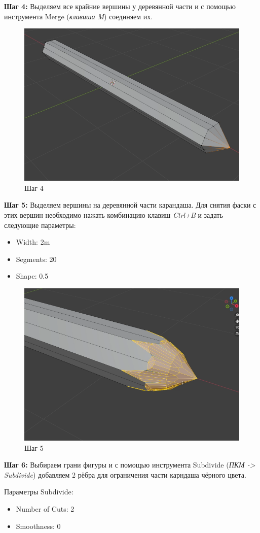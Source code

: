 \documentclass[areasetadvanced]{scrartcl}
\begin{document}
\par \textbf{Шаг 4:} Выделяем все крайние вершины у деревянной части и с помощью инструмента Merge (\textit{клавиша M}) соединяем их.
\begin{figure}[H]
    \label{4} 
    \centering
    \includegraphics[width=0.6\linewidth]{pen/4.png}
    \caption{Шаг 4}
\end{figure}


\par \textbf{Шаг 5:} Выделяем вершины на деревянной части карандаша. Для снятия фаски с этих вершин необходимо нажать комбинацию клавиш \textit{Ctrl+B} и задать следующие параметры:
\begin{itemize}
    \item Width: 2m
    \item Segments: 20
    \item Shape: 0.5
\end{itemize}

\begin{figure}[H]
    \label{4} 
    \centering
    \includegraphics[width=0.6\linewidth]{pen/5.png}
    \caption{Шаг 5}
\end{figure} 


\par \textbf{Шаг 6:} Выбираем грани фигуры и с помощью инструмента Subdivide (\textit{ПКМ -> Subdivide}) добавляем 2 рёбра для ограничения части карндаша чёрного цвета.
\par Параметры Subdivide:
\begin{itemize}
    \item Number of Cuts: 2
    \item Smoothness: 0
\end{itemize}
\end{document}
